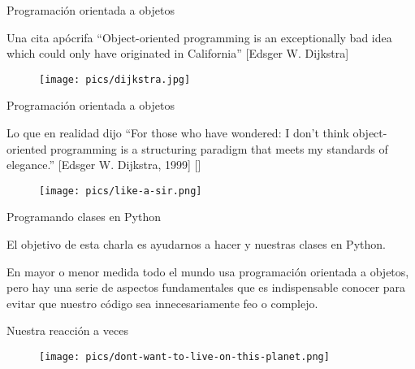 
\begin{frame}{Programación orientada a objetos}
  \small
  \begin{block}
    {\centering Una cita apócrifa}
    \centering
    ``Object-oriented programming is an exceptionally bad
    idea which could only have originated in California''
    [Edsger W. Dijkstra]
  \end{block}

  \begin{figure}
    \centering
    \texttt{[image: pics/dijkstra.jpg]}
  \end{figure}
\end{frame}

\begin{frame}{Programación orientada a objetos}
  \small
  \begin{block}
    {\centering Lo que en realidad dijo}
    \centering
    ``For those who have wondered: I don't think object-oriented
    programming is a structuring paradigm that meets my standards of
    elegance.'' [Edsger W. Dijkstra, 1999]
    [\href{http://www.cs.utexas.edu/users/EWD/transcriptions/EWD12xx/EWD1284.html}
      {}]
  \end{block}

  \begin{figure}
    \centering
    \texttt{[image: pics/like-a-sir.png]}
  \end{figure}
\end{frame}

\begin{frame}{Programando clases en Python}
  \begin{block}{}
    \Large
    \centering
    El objetivo de esta charla es ayudarnos a hacer
     y  nuestras clases en
    Python.
  \end{block}

  \begin{justify}
    En mayor o menor medida todo el mundo usa programación orientada a
    objetos, pero hay una serie de aspectos fundamentales que es
    indispensable conocer para evitar que nuestro código sea
    innecesariamente feo o complejo.
  \end{justify}
\end{frame}

\begin{frame}{Nuestra reacción a veces}
  \begin{figure}
    \centering
    \texttt{[image: pics/dont-want-to-live-on-this-planet.png]}
  \end{figure}
\end{frame}

